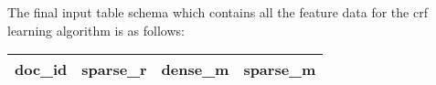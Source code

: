 \begin{itemize}
%

\end{itemize}


The final input table schema which contains all the feature data for the crf learning algorithm is as follows:
\begin{center}
    \begin{tabular}{ | l | l | l | l |}
    \hline
    doc\_id & sparse\_r & dense\_m & sparse\_m \\ 
    \hline
    \end{tabular}
\end{center}

